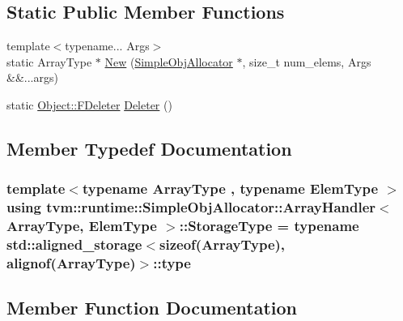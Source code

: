\subsection*{Static Public Member Functions}
\begin{DoxyCompactItemize}
\item 
{\footnotesize template$<$typename... Args$>$ }\\static Array\+Type $\ast$ \hyperlink{classtvm_1_1runtime_1_1SimpleObjAllocator_1_1ArrayHandler_a025fadf9131cce88df531f00c8180d39}{New} (\hyperlink{classtvm_1_1runtime_1_1SimpleObjAllocator}{Simple\+Obj\+Allocator} $\ast$, size\+\_\+t num\+\_\+elems, Args \&\&...args)
\item 
static \hyperlink{classtvm_1_1runtime_1_1Object_a9e84841ca982bff376a978ade0132631}{Object\+::\+F\+Deleter} \hyperlink{classtvm_1_1runtime_1_1SimpleObjAllocator_1_1ArrayHandler_af4771f19c83f265a9cdafd4362e49f56}{Deleter} ()
\end{DoxyCompactItemize}


\subsection{Member Typedef Documentation}
\subsubsection[{\texorpdfstring{Storage\+Type}{StorageType}}]{\setlength{\rightskip}{0pt plus 5cm}template$<$typename Array\+Type , typename Elem\+Type $>$ using {\bf tvm\+::runtime\+::\+Simple\+Obj\+Allocator\+::\+Array\+Handler}$<$ Array\+Type, Elem\+Type $>$\+::{\bf Storage\+Type} =  typename std\+::aligned\+\_\+storage$<$sizeof(Array\+Type), alignof(Array\+Type)$>$\+::type}\hypertarget{classtvm_1_1runtime_1_1SimpleObjAllocator_1_1ArrayHandler_a67e86db3290b1d3bd4aca7e7a2faf187}{}\label{classtvm_1_1runtime_1_1SimpleObjAllocator_1_1ArrayHandler_a67e86db3290b1d3bd4aca7e7a2faf187}


\subsection{Member Function Documentation}
